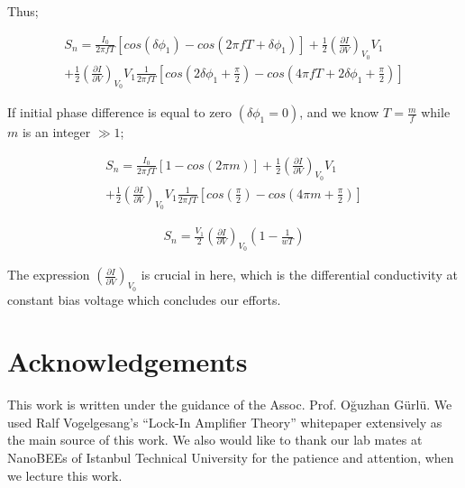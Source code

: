 \documentclass[10pt,a4paper,notitlepage]{article}
\begin{document}
Thus;

\begin{equation}
  \begin{split}
  S_n=\frac{I_0}{2 \pi f T}\left[cos(\delta \phi_1)-cos(2 \pi f T + \delta \phi_1) \right] + \frac{1}{2} \left(\frac{\partial I}{\partial V}\right)_{V_0} V_1 \\
   + \frac{1}{2} \left(\frac{\partial I}{\partial V}\right)_{V_0} V_1 \frac{1}{2 \pi f T} \left[cos \left(2\delta \phi_1 + \frac{\pi}{2}\right)- cos \left(4 \pi f T + 2\delta \phi_1 + \frac{\pi}{2} \right) \right]
\end{split}
\end{equation}

If initial phase difference is equal to zero $(\delta\phi_1=0)$, and we know $T=\frac{m}{f}$ while $m$ is an integer $\gg 1$;

\begin{equation}
  \begin{split}
  S_n=\frac{I_0}{2 \pi f T}\left[1-cos(2 \pi m) \right] + \frac{1}{2} \left(\frac{\partial I}{\partial V}\right)_{V_0} V_1 \\
   + \frac{1}{2} \left(\frac{\partial I}{\partial V}\right)_{V_0} V_1 \frac{1}{2 \pi f T} \left[cos \left(\frac{\pi}{2}\right)- cos \left(4 \pi m + \frac{\pi}{2} \right) \right]
\end{split}
\end{equation}

\begin{equation}
  \begin{split}
  S_n=\frac{V_1}{2}\left(\frac{\partial I}{\partial V}\right)_{V_0} \left(1-\frac{1}{wT} \right)
\end{split}
\end{equation}

The expression $\left(\frac{\partial I}{\partial V}\right)_{V_0}$ is crucial in here, which is the differential conductivity at constant bias voltage which concludes our efforts.

\section{Acknowledgements}

This work is written under the guidance of the Assoc. Prof. O\u{g}uzhan G\"{u}rl\"{u}.
We used Ralf Vogelgesang’s “Lock-In Amplifier Theory” whitepaper \cite{ralf} extensively as the
main source of this work. We also would like to thank our lab mates at NanoBEEs of Istanbul Technical University for the patience and attention, when we lecture this work.




\end{document}
